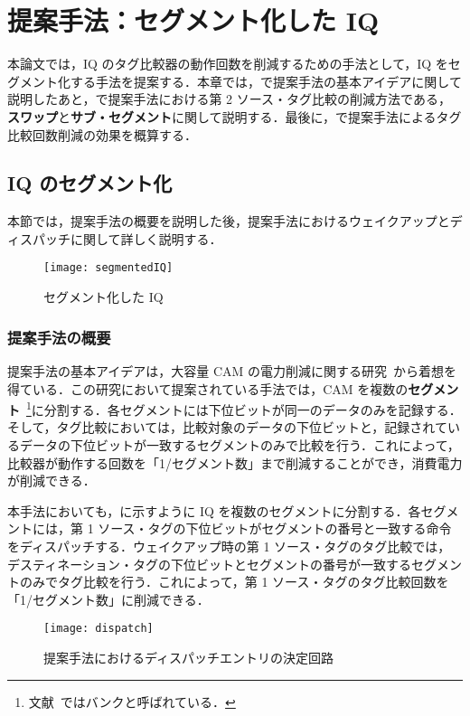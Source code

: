 
\chapter{提案手法：セグメント化した IQ}
\label{sec:segment_IQ}
本論文では，IQ のタグ比較器の動作回数を削減するための手法として，IQ をセグメント化する手法を提案する．本章では，で提案手法の基本アイデアに関して説明したあと，で提案手法における第 2 ソース・タグ比較の削減方法である，\textbf{スワップ}と\textbf{サブ・セグメント}に関して説明する．最後に，で提案手法によるタグ比較回数削減の効果を概算する．

\section{IQ のセグメント化}
\label{sec:segmented_IQ}
本節では，提案手法の概要を説明した後，提案手法におけるウェイクアップとディスパッチに関して詳しく説明する．

\begin{figure}[htb]
  \centering
  \texttt{[image: segmentedIQ]}
  \caption{セグメント化した IQ}
  \label{fig:segmentedIQ}
\end{figure}

\subsection{提案手法の概要}
提案手法の基本アイデアは，大容量 CAM の電力削減に関する研究~\cite{Motomura1990paper, Motomura1990journal}から着想を得ている．この研究において提案されている手法では，CAM を複数の\textbf{セグメント}~\footnote{文献~\cite{Motomura1990paper, Motomura1990journal}ではバンクと呼ばれている．}に分割する．各セグメントには下位ビットが同一のデータのみを記録する．そして，タグ比較においては，比較対象のデータの下位ビットと，記録されているデータの下位ビットが一致するセグメントのみで比較を行う．これによって，比較器が動作する回数を「1/セグメント数」まで削減することができ，消費電力が削減できる．

本手法においても，に示すように IQ を複数のセグメントに分割する．各セグメントには，第 1 ソース・タグの下位ビットがセグメントの番号と一致する命令をディスパッチする．ウェイクアップ時の第 1 ソース・タグのタグ比較では，デスティネーション・タグの下位ビットとセグメントの番号が一致するセグメントのみでタグ比較を行う．これによって，第 1 ソース・タグのタグ比較回数を「1/セグメント数」に削減できる．

\begin{figure}[tb]
  \centering
  \texttt{[image: dispatch]}
  \caption{提案手法におけるディスパッチエントリの決定回路}
  \label{fig:dispatch}
\end{figure}


